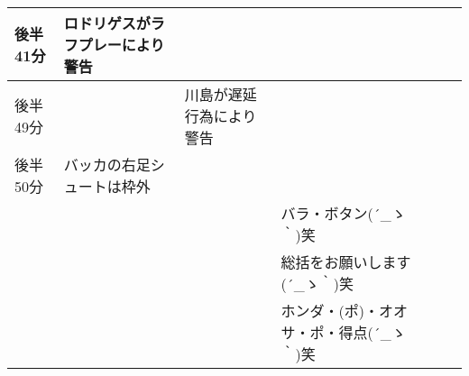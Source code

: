 \begin{table}[htb]
{\begin{tabular}{|l|l|l|l|l|l|}
      後半41分  & ロドリゲスがラフプレーにより警告             &                                       &   \\ \hline
      後半49分  &                                              & 川島が遅延行為により警告              & \\ \hline
      後半50分  & バッカの右足シュートは枠外                   &                                       &  \\ \hline
                &                                              &                                       & バラ・ボタン\sf (´\_ゝ｀)笑 \\ \hline
                &                                              &                                       & 総括をお願いします\sf (´\_ゝ｀)笑 \\ \hline
                &                                              &                                       & ホンダ・(ポ)・オオサ・ポ・得点\sf (´\_ゝ｀)笑 \\ \hline
    \end{tabular}
    }
\end{table}
